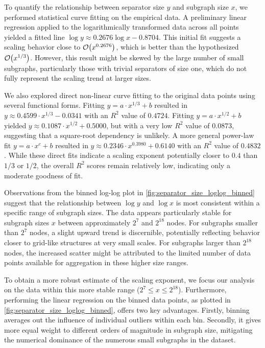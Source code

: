 To quantify the relationship between separator size \( y \) and subgraph size \( x \), we performed statistical curve fitting on the empirical data.
A preliminary linear regression applied to the logarithmically transformed data across all points yielded a fitted line \( \log y \approx 0.2676 \log x - 0.8704 \).
This initial fit suggests a scaling behavior close to \( \mathcal{O}\!\left(x^{0.2676}\right) \), which is better than the hypothesized \( \mathcal{O}\!\left(x^{1/3}\right) \).
However, this result might be skewed by the large number of small subgraphs, particularly those with trivial separators of size one, which do not fully represent the scaling trend at larger sizes.

We also explored direct non-linear curve fitting to the original data points using several functional forms.
Fitting \( y = a \cdot x^{1/3} + b \) resulted in \( y \approx 0.4599 \cdot x^{1/3} - 0.0341 \) with an \( R^2 \) value of \( 0.4724 \).
Fitting \( y = a \cdot x^{1/2} + b \) yielded \( y \approx 0.1087 \cdot x^{1/2} + 0.5000 \), but with a very low \( R^2 \) value of \( 0.0873 \), suggesting that a square-root dependency is unlikely.
A more general power-law fit \( y = a \cdot x^c + b \) resulted in \( y \approx 0.2346 \cdot x^{0.3980} + 0.6140 \) with an \( R^2 \) value of \( 0.4832 \).
While these direct fits indicate a scaling exponent potentially closer to \( 0.4 \) than \( 1/3 \) or \( 1/2 \), the overall \( R^2 \) scores remain relatively low, indicating only a moderate goodness of fit.

Observations from the binned log-log plot in \cref{fig:separator_size_loglog_binned} suggest that the relationship between \( \log y \) and \( \log x \) is most consistent within a specific range of subgraph sizes.
The data appears particularly stable for subgraph sizes \( x \) between approximately \( 2^7 \) and \( 2^{18} \) nodes.
For subgraphs smaller than \( 2^7 \) nodes, a slight upward trend is discernible, potentially reflecting behavior closer to grid-like structures at very small scales.
For subgraphs larger than \( 2^{18} \) nodes, the increased scatter might be attributed to the limited number of data points available for aggregation in these higher size ranges.

To obtain a more robust estimate of the scaling exponent, we focus our analysis on the data within this more stable range (\( 2^7 \le x \le 2^{18} \)).
Furthermore, performing the linear regression on the binned data points, as plotted in \cref{fig:separator_size_loglog_binned}, offers two key advantages.
Firstly, binning averages out the influence of individual outliers within each bin.
Secondly, it gives more equal weight to different orders of magnitude in subgraph size, mitigating the numerical dominance of the numerous small subgraphs in the dataset.

